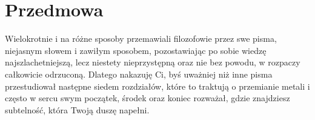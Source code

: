 \null
\vfill

\section*{Przedmowa}

Wielokrotnie i na różne sposoby przemawiali filozofowie przez swe pisma, niejasnym słowem i zawiłym sposobem, pozostawiając po sobie wiedzę najszlachetniejszą, lecz niestety nieprzystępną oraz nie bez powodu, w rozpaczy całkowicie odrzuconą. Dlatego nakazuję Ci, byś uważniej niż inne pisma przestudiował następne siedem rozdziałów, które to traktują o przemianie metali i często w sercu swym początek, środek oraz koniec rozważał, gdzie znajdziesz subtelność, która Twoją duszę napełni.

\vfill
